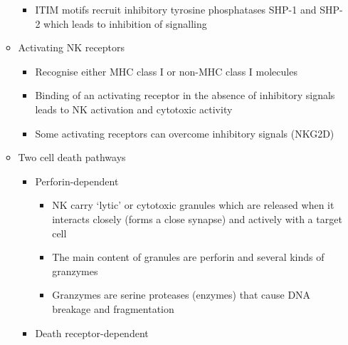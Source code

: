 \documentclass[a4paper, 12pt]{article}
\begin{document}
\begin{itemize}
\begin{itemize}
\begin{itemize}
\item{ITIM motifs recruit inhibitory tyrosine phosphatases SHP-1 and SHP-2 which leads to inhibition of signalling}
\end{itemize}
\item{Activating NK receptors}
\begin{itemize}
\item{Recognise either MHC class I or non-MHC class I molecules}
\item{Binding of an activating receptor in the absence of inhibitory signals leads to NK activation and cytotoxic activity}
\item{Some activating receptors can overcome inhibitory signals (NKG2D)}
\end{itemize}
\item{Two cell death pathways}
\begin{itemize}
\item{Perforin-dependent}
\begin{itemize}
\item{NK carry `lytic' or cytotoxic granules which are released when it interacts closely (forms a close synapse) and actively with a target cell}
\item{The main content of granules are perforin and several kinds of granzymes}
\item{Granzymes are serine proteases (enzymes) that cause DNA breakage and fragmentation}
\end{itemize}
\item{Death receptor-dependent}
\end{itemize}
\end{itemize}
\end{itemize}
\end{document}
